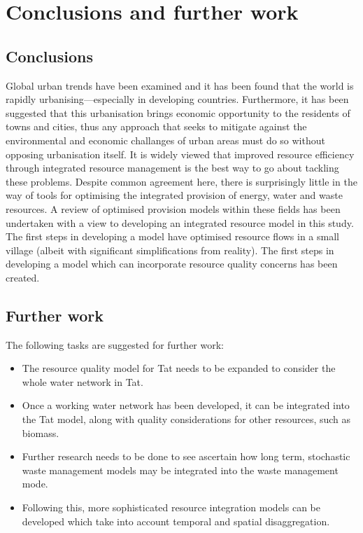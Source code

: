 \section{Conclusions and further work}
\label{sec:conc}

\subsection{Conclusions}
Global urban trends have been examined and it has been found that the world is rapidly urbanising---especially in developing countries. Furthermore, it has been suggested that this urbanisation brings economic opportunity to the residents of towns and cities, thus any approach that seeks to mitigate against the environmental and economic challanges of urban areas must do so without opposing urbanisation itself. It is widely viewed that improved resource efficiency through integrated resource management is the best way to go about tackling these problems. Despite common agreement here, there is surprisingly little in the way of tools for optimising the integrated provision of energy, water and waste resources. A review of optimised provision models within these fields has been undertaken with a view to developing an integrated resource model in this study. The first steps in developing a model have optimised resource flows in a small village (albeit with significant simplifications from reality). The first steps in developing a model which can incorporate resource quality concerns has been created.

\subsection{Further work}
The following tasks are suggested for further work:
\begin{itemize}
	\item The resource quality model for Tat needs to be expanded to consider the whole water network in Tat.
	\item Once a working water network has been developed, it can be integrated into the Tat model, along with quality considerations for other resources, such as biomass. 
	\item Further research needs to be done to see ascertain how long term, stochastic waste management models may be integrated into the waste management mode.
	\item Following this, more sophisticated resource integration models can be developed which take into account temporal and spatial disaggregation.
\end{itemize}

